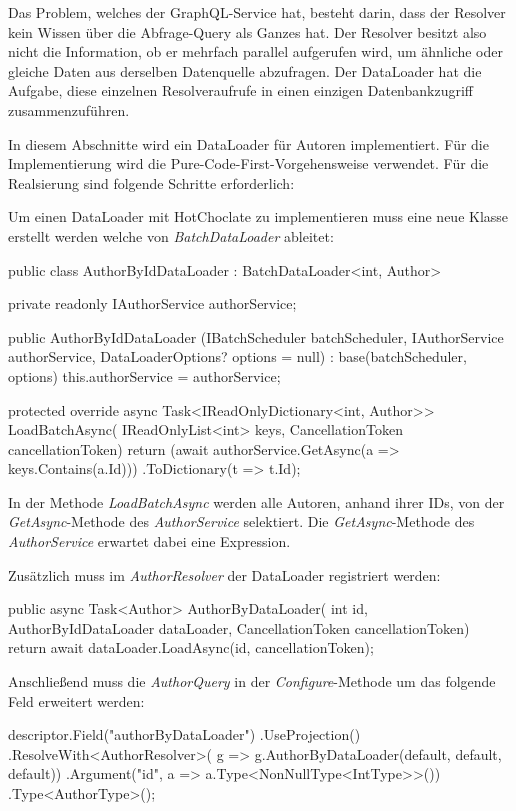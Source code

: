 Das Problem, welches der GraphQL-Service hat, besteht darin, dass der Resolver kein Wissen über die Abfrage-Query als Ganzes hat.
Der Resolver besitzt also nicht die Information, ob er mehrfach parallel aufgerufen wird, um ähnliche oder gleiche Daten aus derselben Datenquelle abzufragen.
Der DataLoader hat die Aufgabe, diese einzelnen Resolveraufrufe in einen einzigen Datenbankzugriff zusammenzuführen.

In diesem Abschnitte wird ein DataLoader für Autoren implementiert.
Für die Implementierung wird die Pure-Code-First-Vorgehensweise verwendet.
Für die Realsierung sind folgende Schritte erforderlich:
\newline

Um einen DataLoader mit HotChoclate zu implementieren muss eine neue Klasse erstellt werden welche von \textit{BatchDataLoader} ableitet:
\begin{JsCode}
public class AuthorByIdDataLoader : BatchDataLoader<int, Author> {
    private readonly IAuthorService authorService;

    public AuthorByIdDataLoader
        (IBatchScheduler batchScheduler, IAuthorService authorService,
        DataLoaderOptions? options = null) : base(batchScheduler, options)
    {
        this.authorService = authorService;
    }

    protected override async Task<IReadOnlyDictionary<int, Author>> LoadBatchAsync(
        IReadOnlyList<int> keys, CancellationToken cancellationToken)
    {
        return (await authorService.GetAsync(a => keys.Contains(a.Id)))
               .ToDictionary(t => t.Id);
    }
}
\end{JsCode}
In der Methode \textit{LoadBatchAsync} werden alle Autoren, anhand ihrer IDs, von der \textit{GetAsync}-Methode des \textit{AuthorService} selektiert.
Die \textit{GetAsync}-Methode des \textit{AuthorService} erwartet dabei eine Expression.
\newline

Zusätzlich muss im \textit{AuthorResolver} der DataLoader registriert werden:
\begin{JsCode}
public async Task<Author> AuthorByDataLoader(
    int id,
    AuthorByIdDataLoader dataLoader,
    CancellationToken cancellationToken) 
{
    return await dataLoader.LoadAsync(id, cancellationToken);
}
\end{JsCode}

Anschließend muss die \textit{AuthorQuery} in der \textit{Configure}-Methode um das folgende Feld erweitert werden:
\begin{JsCode}
descriptor.Field("authorByDataLoader")
    .UseProjection()
    .ResolveWith<AuthorResolver>(
        g => g.AuthorByDataLoader(default, default, default))
    .Argument("id", a => a.Type<NonNullType<IntType>>())
    .Type<AuthorType>();
\end{JsCode}

